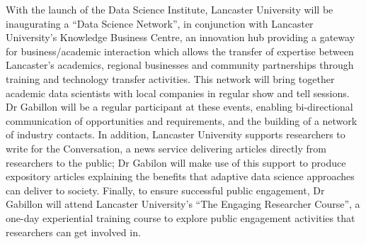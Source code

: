 \documentclass[a4paper,11pt]{article}
\newcommand{\TODO}[1]{{\textcolor{red}{[\textbf{TODO:} #1]}}}
\begin{document}
%

With the launch of the Data Science Institute, Lancaster University will be inaugurating a ``Data Science Network'', in conjunction with Lancaster University's Knowledge Business Centre, an innovation hub providing a gateway for business/academic interaction which allows the transfer of expertise between Lancaster's academics, regional businesses and community partnerships through training and technology transfer activities.  This network will bring together academic data scientists with local companies in regular show and tell sessions.  Dr Gabillon will be a regular participant at these events, enabling bi-directional communication of opportunities and requirements, and the building of a network of industry contacts.
In addition, Lancaster University supports researchers to write for the Conversation, a news  service delivering articles directly from researchers to the public; Dr Gabilon will make use of this support to produce expository articles explaining the benefits that adaptive data science approaches can deliver to society.
Finally, to ensure successful public engagement, Dr Gabillon will attend Lancaster University's ``The Engaging Researcher Course'', a one-day experiential training course to explore public engagement activities that researchers can get involved in.
\end{document}
